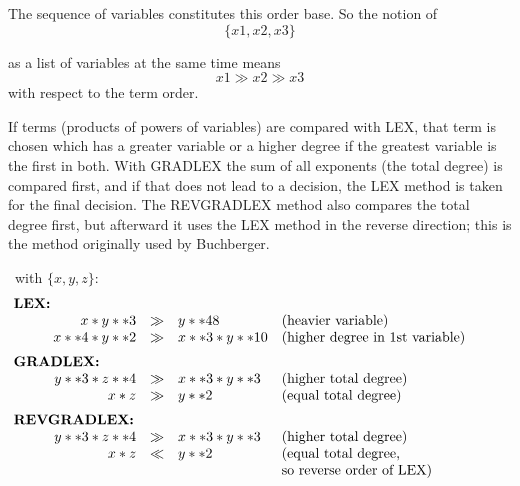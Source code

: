 The sequence of variables constitutes this order base. So the notion
of
\[
\{x1,x2,x3\}
\]

as a list of variables at the same time means
\[
x1 \gg x2 \gg x3
\]
with respect to the term order.

If terms (products of powers of variables) are compared with LEX,
that term is chosen which has a greater variable or a higher degree
if the greatest variable is the first in both. With GRADLEX the sum of
all exponents (the total degree) is compared first, and if that does
not lead to a decision, the LEX method is taken for the final decision.
The REVGRADLEX method also compares the total degree first, but
afterward it uses the LEX method in the reverse direction; this is the
method originally used by Buchberger.

\example \ with $\{x,y,z\}$: 
\[
\begin{array}{rlll}
\multicolumn{2}{l}{\hspace*{-1cm}\mbox{\bf LEX:}}\\
 x * y **3 & \gg & y ** 48 & \mbox{(heavier variable)} \\
 x**4 * y**2 & \gg  & x**3 * y**10 & \mbox{(higher degree in 1st
variable)} \vspace*{2mm} \\
\multicolumn{2}{l}{\hspace*{-1cm}\mbox{\bf GRADLEX:}} \\
  y**3 * z**4 & \gg & x**3 * y**3 & \mbox{(higher total degree)} \\
  x*z  &        \gg & y**2  & \mbox{(equal total degree)}
\vspace*{2mm}\\
\multicolumn{2}{l}{\hspace*{-1cm}\mbox{\bf
REVGRADLEX:}} \\
 y**3 * z**4 & \gg &  x**3 * y**3 & \mbox{(higher total degree)} \\
 x*z         & \ll  &  y**2       & \mbox{(equal total degree,} \\
 & & & \mbox{so reverse order of LEX)}
\end{array}
\]

